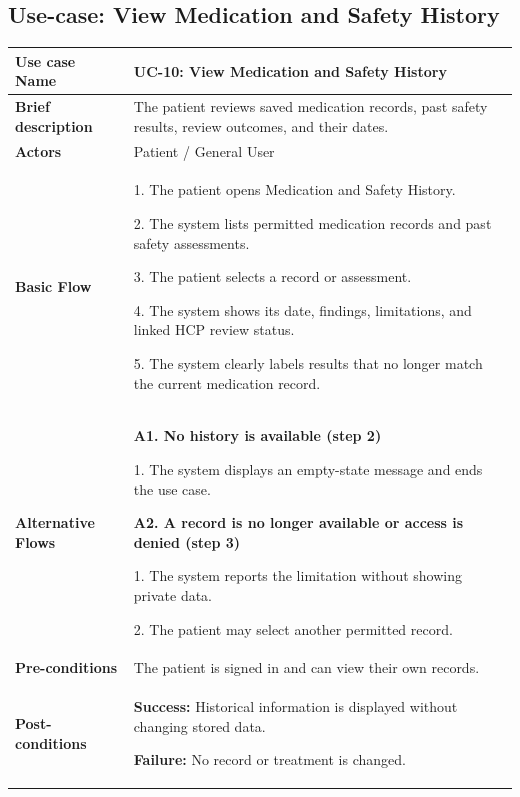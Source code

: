 \subsection{Use-case: View Medication and Safety History}
\label{uc:uc-10}
\begin{longtable}{|p{}|p{}|}
\hline
\textbf{Use case Name} & UC-10: View Medication and Safety History \\ \hline
\textbf{Brief description} & The patient reviews saved medication records, past safety results, review outcomes, and their dates. \\ \hline
\textbf{Actors} & Patient / General User \\ \hline
\textbf{Basic Flow} &
1. The patient opens Medication and Safety History.\par
2. The system lists permitted medication records and past safety assessments.\par
3. The patient selects a record or assessment.\par
4. The system shows its date, findings, limitations, and linked HCP review status.\par
5. The system clearly labels results that no longer match the current medication record.
\\ \hline
\textbf{Alternative Flows} &
\textbf{A1. No history is available (step 2)}\par
1. The system displays an empty-state message and ends the use case.
\par\smallskip
\textbf{A2. A record is no longer available or access is denied (step 3)}\par
1. The system reports the limitation without showing private data.\par
2. The patient may select another permitted record.
\\ \hline
\textbf{Pre-conditions} & The patient is signed in and can view their own records. \\ \hline
\textbf{Post-conditions} & \textbf{Success:} Historical information is displayed without changing stored data.\par
\textbf{Failure:} No record or treatment is changed. \\ \hline
\end{longtable}


